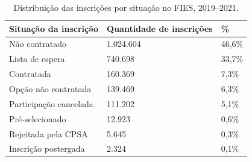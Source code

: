 \begin{table}
\caption{Distribuição das inscrições por situação no FIES, 2019--2021.}
\label{tab:distribuicao_situacao_inscricao}
\begin{tabular}{lll}
\toprule
Situação da inscrição & Quantidade de inscrições & \% \\
\midrule
Não contratado & 1.024.604 & 46,6\% \\
Lista de espera & 740.698 & 33,7\% \\
Contratada & 160.369 & 7,3\% \\
Opção não contratada & 139.469 & 6,3\% \\
Participação cancelada & 111.202 & 5,1\% \\
Pré-selecionado & 12.923 & 0,6\% \\
Rejeitada pela CPSA & 5.645 & 0,3\% \\
Inscrição postergada & 2.324 & 0,1\% \\
\bottomrule
\end{tabular}
\end{table}

